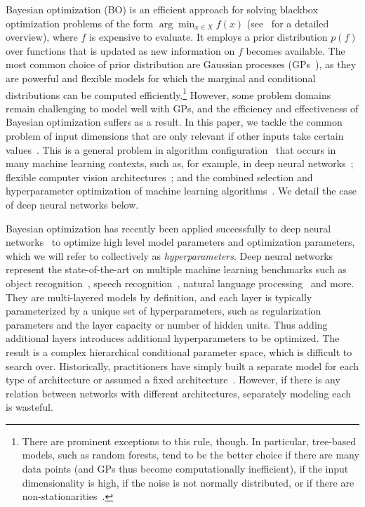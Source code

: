 \documentclass{article}
\begin{document}
Bayesian optimization (BO) is an efficient approach for solving blackbox optimization problems of the form $\arg\min_{x \in X} f(x)$ (see~\cite{Brochu2010} for a detailed overview), where $f$ is expensive to evaluate. 
It employs a prior distribution $p(f)$ over functions that is updated as new information on $f$ becomes available.
%
The most common choice of prior distribution are Gaussian processes (GPs~\cite{rasmussen38gaussian}), as they are powerful and flexible models for which the marginal and conditional distributions can be computed efficiently.\footnote{There are prominent exceptions to this rule, though. In particular, tree-based models, such as random forests, tend to be the better choice if there are many data points (and GPs thus become computationally inefficient), if the input dimensionality is high, if the noise is not normally distributed, or if there are non-stationarities~\cite{TadGraPol11,HutHooLey11,BerEtAl11}.}
%
However, some problem domains remain challenging to model well with GPs, and the efficiency and effectiveness of Bayesian optimization suffers as a result. In this paper, we tackle the common problem of input dimensions that are only relevant if other inputs take certain values~\cite{Hut09:phd,BergstraJ2011}. This is a general problem in algorithm configuration~\cite{Hut09:phd} that occurs in many machine learning contexts, such as, for example, in deep neural networks~\cite{HinOsiTeh06}; flexible computer vision architectures~\cite{BerYamCox13}; and the combined selection and hyperparameter optimization of machine learning algorithms~\cite{ThoEtAl13}. We detail the case of deep neural networks below.

Bayesian optimization has recently been applied successfully to deep neural networks~\cite{snoek-etal-2012b, BergstraJ2011} to optimize high level model parameters and optimization parameters, which we will refer to collectively as \emph{hyperparameters}.  Deep neural networks represent the state-of-the-art on multiple machine learning benchmarks such as object recognition~\cite{krizhevsky-2012}, speech recognition~\cite{deepSpeechReviewSPM2012}, natural language processing~\cite{mikolov2010recurrent} and more.
They are multi-layered models by definition, and each layer is typically parameterized by a unique set of hyperparameters, such as regularization parameters and the layer capacity or number of hidden units.  Thus adding additional layers introduces additional hyperparameters to be optimized.  The result is a complex hierarchical conditional parameter space, which is difficult to search over.  Historically, practitioners have simply built a separate model for each type of architecture \cite{bergstra2011algorithms} or assumed a fixed architecture~\cite{snoek-etal-2012b}.  However, if there is any relation between networks with different architectures, separately modeling each is wasteful. 
\end{document}
